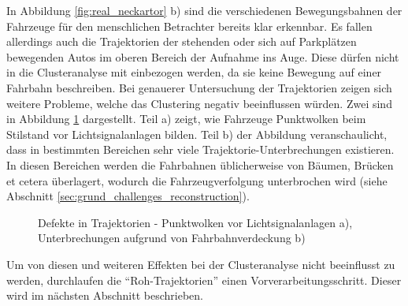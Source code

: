 In Abbildung \ref{fig:real_neckartor} b) sind die verschiedenen Bewegungsbahnen der Fahrzeuge für
den menschlichen Betrachter bereits klar erkennbar.
Es fallen allerdings auch die Trajektorien der stehenden oder sich auf Parkplätzen
bewegenden Autos im oberen Bereich der Aufnahme ins Auge. Diese dürfen nicht in die Clusteranalyse mit einbezogen werden,
da sie keine Bewegung auf einer Fahrbahn beschreiben.
Bei genauerer Untersuchung der Trajektorien zeigen sich weitere Probleme, welche das Clustering negativ
beeinflussen würden.
Zwei sind in Abbildung \ref{fig:real_defects_trajectories} dargestellt.
Teil a) zeigt, wie Fahrzeuge Punktwolken beim Stilstand vor Lichtsignalanlagen bilden.
Teil b) der Abbildung veranschaulicht, dass in bestimmten Bereichen sehr viele Trajektorie-Unterbrechungen
existieren.
In diesen Bereichen werden die Fahrbahnen üblicherweise von Bäumen, Brücken et cetera überlagert, wodurch
die Fahrzeugverfolgung unterbrochen wird (siehe Abschnitt \ref{sec:grund_challenges_reconstruction}).

\begin{figure}[H]
    \centering
    \qquad
    \caption[Beispiel Defekte in Trajektoriedaten]
            {Defekte in Trajektorien - Punktwolken vor Lichtsignalanlagen a), Unterbrechungen aufgrund von Fahrbahnverdeckung b)}
    \label{fig:real_defects_trajectories}
\end{figure}

Um von diesen und weiteren Effekten bei der Clusteranalyse nicht beeinflusst zu werden, durchlaufen die
``Roh-Trajektorien'' einen Vorverarbeitungsschritt. Dieser wird im nächsten Abschnitt beschrieben.

